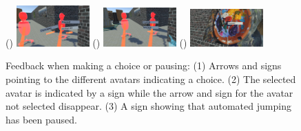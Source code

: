 \begin{figure}[]
	\centering
	() {\includegraphics[width=0.25\textwidth]{images/choose.pdf}}
	() {\includegraphics[width=0.25\textwidth]{images/choice-made.pdf}}
	() {\includegraphics[width=0.25\textwidth]{images/paused.pdf}} 
	\caption{Feedback when making a choice or pausing: (1) Arrows and signs pointing to the different avatars indicating a choice. (2) The selected avatar is indicated by a sign while the arrow and sign for the avatar not selected disappear. (3) A sign showing that automated jumping has been paused.}
	\label{fig:automated-jumping-feedback-ui}
\end{figure} 

